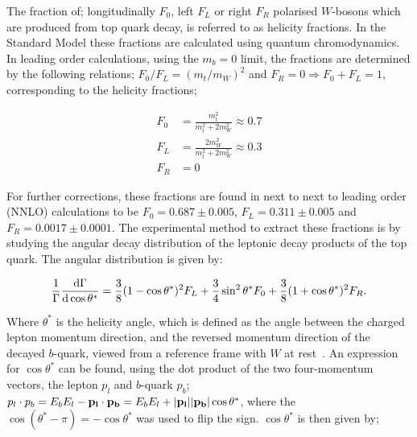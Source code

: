\documentclass[12pt,a4paper]{article}
\numberwithin{equation}{section}
\begin{document}
The fraction of; longitudinally $F_0$, left $F_L$ or right $F_R$ polarised
$W$-bosons which are produced from top quark decay, is referred to as helicity
fractions. In the Standard Model these fractions are calculated using quantum
chromodynamics. In leading order calculations, using the $m_b = 0$ limit, the
fractions are determined by the following relations; $F_0/F_L = (m_t/m_W)^2$
and $F_R = 0 \Rightarrow F_0 + F_L = 1$, corresponding to the helicity fractions;

\begin{align}
\label{eq:helfrac}
  F_0 &= \frac{m_t^2}{m_t^2 + 2 m_W^2} \approx 0.7\\
  F_L &= \frac{2 m_W^2}{m_t^2 + 2 m_W^2} \approx 0.3\\
  F_R &= 0
\end{align}

For further corrections, these fractions are found in next to next to leading
order (NNLO) calculations to be $F_0 = 0.687 \pm 0.005$, $F_L = 0.311 \pm 0.005$
and $F_R = 0.0017 \pm 0.0001$\cite{Czarnecki_2010}. The experimental method to
extract these fractions is by studying the angular decay distribution of the
leptonic decay products of the top quark. The angular distribution is given by:

\begin{equation}
  \frac{1}{\Gamma}\dv{\Gamma}{\cos \theta^*} = \frac{3}{8}(1-\cos \theta^*)^2 F_L +
  \frac{3}{4}\sin^2 \theta^* F_0 + \frac{3}{8}(1+\cos \theta^*)^2 F_R.
\end{equation}

Where $\theta^*$ is the helicity angle, which is defined as the angle between the
charged lepton momentum direction, and the reversed momentum direction of the
decayed $b$-quark, viewed from a reference frame with $W$ at
rest~\cite{PhysRevD.45.124}. An expression for $\cos \theta^*$ can be found, using
the dot product of the two four-momentum vectors, the lepton $p_l$ and $b$-quark
$p_b$; $p_l\cdot p_b=E_bE_l-\vb{p_l\cdot p_b}=E_bE_l+\abs{\vb{p_l}}\abs{\vb{p_b}}\cos \theta^*$,
where the $\cos{(\theta^{*}-\pi)}=-\cos \theta^{*}$ was used to flip the sign.
$\cos \theta^{*}$ is then given by;
\end{document}
